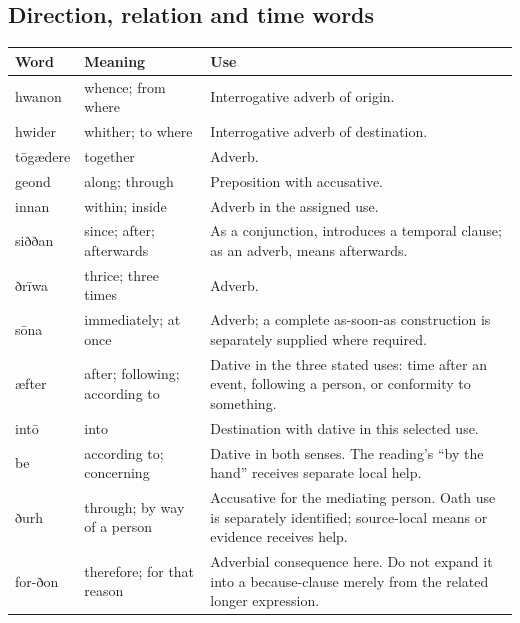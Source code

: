 \subsection*{Direction, relation and time words}

\par\begingroup
\fontsize{10.5}{13.2}\selectfont
\setlength{\LTleft}{0pt}\setlength{\LTright}{\fill}
\noindent
\begin{tabular}{@{}>{\raggedright\arraybackslash}p{18.5mm}>{\raggedright\arraybackslash}p{26.31mm}>{\raggedright\arraybackslash}p{73.57mm}@{}}
\toprule
\textbf{Word} & \textbf{Meaning} & \textbf{Use} \\
\midrule
hwanon & whence; from where & Interrogative adverb of origin. \\
hwider & whither; to where & Interrogative adverb of destination. \\
tōgædere & together & Adverb. \\
geond & along; through & Preposition with accusative. \\
innan & within; inside & Adverb in the assigned use. \\
siððan & since; after; afterwards & As a conjunction, introduces a temporal clause; as an adverb, means afterwards. \\
ðrīwa & thrice; three times & Adverb. \\
sōna & immediately; at once & Adverb; a complete as-soon-as construction is separately supplied where required. \\
æfter & after; following; according to & Dative in the three stated uses: time after an event, following a person, or conformity to something. \\
intō & into & Destination with dative in this selected use. \\
be & according to; concerning & Dative in both senses. The reading’s “by the hand” receives separate local help. \\
ðurh & through; by way of a person & Accusative for the mediating person. Oath use is separately identified; source-local means or evidence receives help. \\
for-ðon & therefore; for that reason & Adverbial consequence here. Do not expand it into a because-clause merely from the related longer expression. \\
\bottomrule
\end{tabular}
\par\endgroup

